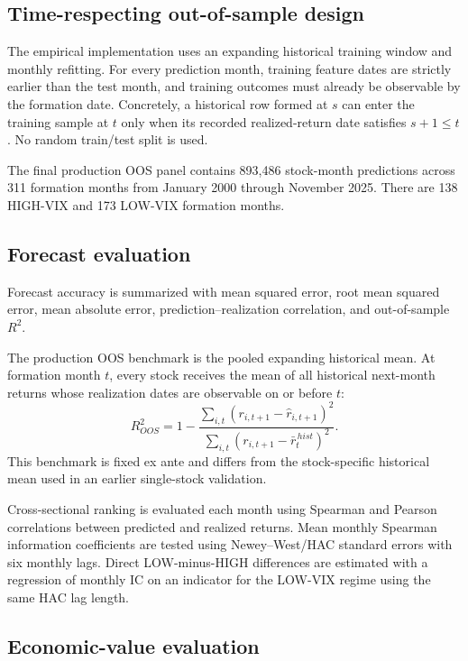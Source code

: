 \subsection{Time-respecting out-of-sample design}

The empirical implementation uses an expanding historical training window and monthly refitting. For every prediction month, training feature dates are strictly earlier than the test month, and training outcomes must already be observable by the formation date. Concretely, a historical row formed at $s$ can enter the training sample at $t$ only when its recorded realized-return date satisfies $s+1\leq t$. No random train/test split is used.

The final production OOS panel contains 893,486 stock-month predictions across 311 formation months from January 2000 through November 2025. There are 138 HIGH-VIX and 173 LOW-VIX formation months.

\subsection{Forecast evaluation}

Forecast accuracy is summarized with mean squared error, root mean squared error, mean absolute error, prediction--realization correlation, and out-of-sample $R^2$.

The production OOS benchmark is the pooled expanding historical mean. At formation month $t$, every stock receives the mean of all historical next-month returns whose realization dates are observable on or before $t$:
\begin{equation}
R^2_{OOS}
=
1-
\frac{\sum_{i,t}(r_{i,t+1}-\widehat r_{i,t+1})^2}
{\sum_{i,t}(r_{i,t+1}-\bar r^{\,hist}_{t})^2}.
\end{equation}
This benchmark is fixed ex ante and differs from the stock-specific historical mean used in an earlier single-stock validation.

Cross-sectional ranking is evaluated each month using Spearman and Pearson correlations between predicted and realized returns. Mean monthly Spearman information coefficients are tested using Newey--West/HAC standard errors with six monthly lags. Direct LOW-minus-HIGH differences are estimated with a regression of monthly IC on an indicator for the LOW-VIX regime using the same HAC lag length.

\subsection{Economic-value evaluation}

